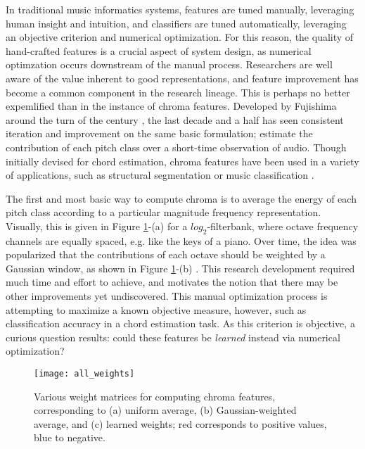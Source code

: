 In traditional music informatics systems, features are tuned manually, leveraging human insight and intuition, and classifiers are tuned automatically, leveraging an objective criterion and numerical optimization.
For this reason, the quality of hand-crafted features is a crucial aspect of system design, as numerical optimzation occurs downstream of the manual process.
Researchers are well aware of the value inherent to good representations, and feature improvement has become a common component in the research lineage.
This is perhaps no better expemlified than in the instance of chroma features.
Developed by Fujishima around the turn of the century \cite{Fujishima1999}, the last decade and a half has seen consistent iteration and improvement on the same basic formulation; estimate the contribution of each pitch class over a short-time observation of audio.
Though initially devised for chord estimation, chroma features have been used in a variety of applications, such as structural segmentation \cite{Levy2007} or music classification \cite{Mandel2005}.

The first and most basic way to compute chroma is to average the energy of each pitch class according to a particular magnitude frequency representation.
Visually, this is given in Figure \ref{fig:all_weights}-(a) for a $log_2$-filterbank, where octave frequency channels are equally spaced, e.g. like the keys of a piano.
Over time, the idea was popularized that the contributions of each octave should be weighted by a Gaussian window, as shown in Figure \ref{fig:all_weights}-(b) \cite{Cho2014}.
This research development required much time and effort to achieve, and motivates the notion that there may be other improvements yet undiscovered.
This manual optimization process is attempting to maximize a known objective measure, however, such as classification accuracy in a chord estimation task.
As this criterion is objective, a curious question results: could these features be \emph{learned} instead via numerical optimization?

\begin{figure}
\begin{centering}
\texttt{[image: all\_weights]}
\caption{Various weight matrices for computing chroma features, corresponding to (a) uniform average, (b) Gaussian-weighted average, and (c) learned weights; red corresponds to positive values, blue to negative.}
\label{fig:all_weights}
\end{centering}
\end{figure}

